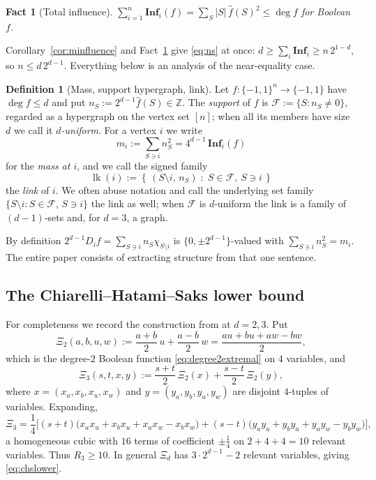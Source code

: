 \documentclass[11pt,reqno]{amsart}
\theoremstyle{plain}
\newtheorem{fact}[theorem]{Fact}
\theoremstyle{definition}
\newtheorem{definition}[theorem]{Definition}
\numberwithin{theorem}{section}
\newcommand{\cube}{\{-1,1\}}
\newcommand{\Inf}{\mathbf{Inf}}
\newcommand{\lk}{\operatorname{lk}}
\newcommand{\bbZ}{\mathbb{Z}}
\newcommand{\Fhat}[1]{\widehat{#1}}
\newcommand{\XiC}{\Xi}
\DeclareMathOperator{\Deg}{deg}
\begin{document}
\begin{fact}[Total influence]\label{fact:totalinf}
$\sum_{i=1}^n \Inf_i(f) = \sum_S |S|\,\Fhat{f}(S)^2 \le \Deg f$ for Boolean $f$.
\end{fact}

Corollary~\ref{cor:minfluence} and Fact~\ref{fact:totalinf} give \eqref{eq:ns} at once:
$d \ge \sum_i \Inf_i \ge n\,2^{1-d}$, so $n \le d\,2^{d-1}$. Everything below is an analysis of
the near-equality case.

\begin{definition}[Mass, support hypergraph, link]\label{def:link}
Let $f \colon \cube^n \to \cube$ have $\Deg f \le d$ and put $n_S := 2^{d-1}\Fhat{f}(S)
\in \bbZ$. The \emph{support} of $f$ is $\mathcal{F} := \{S : n_S \ne 0\}$, regarded as a
hypergraph on the vertex set $[n]$; when all its members have size $d$ we call it
\emph{$d$-uniform}. For a vertex $i$ we write
\[
  m_i := \sum_{S \ni i} n_S^2 = 4^{d-1}\,\Inf_i(f)
\]
for the \emph{mass at $i$}, and we call the signed family
\[
  \lk(i) := \left\{\, (S \setminus i,\, n_S) \;:\; S \in \mathcal{F},\ S \ni i \,\right\}
\]
the \emph{link} of $i$. We often abuse notation and call the underlying set family
$\{S \setminus i : S \in \mathcal{F},\, S \ni i\}$ the link as well; when $\mathcal{F}$ is
$d$-uniform the link is a family of $(d-1)$-sets and, for $d = 3$, a graph.
\end{definition}

By definition $2^{d-1}D_i f = \sum_{S \ni i} n_S \chi_{S \setminus i}$ is
$\{0, \pm 2^{d-1}\}$-valued with $\sum_{S \ni i} n_S^2 = m_i$. The entire paper consists of
extracting structure from that one sentence.

\subsection{The Chiarelli--Hatami--Saks lower bound}
For completeness we record the construction from \cite[\S3]{CHS20} at $d = 2, 3$. Put
\[
  \XiC_2(a,b,u,w) := \frac{a+b}{2}\,u + \frac{a-b}{2}\,w
  = \frac{au + bu + aw - bw}{2},
\]
which is the degree-$2$ Boolean function \eqref{eq:degree2extremal} on $4$ variables, and
\[
  \XiC_3(s,t,x,y) := \frac{s+t}{2}\,\XiC_2(x) + \frac{s-t}{2}\,\XiC_2(y),
\]
where $x = (x_a,x_b,x_u,x_w)$ and $y = (y_a,y_b,y_u,y_w)$ are disjoint $4$-tuples of variables.
Expanding,
\[
  \XiC_3 = \frac14\Big[ (s+t)\big(x_ax_u + x_bx_u + x_ax_w - x_bx_w\big)
        + (s-t)\big(y_ay_u + y_by_u + y_ay_w - y_by_w\big) \Big],
\]
a homogeneous cubic with $16$ terms of coefficient $\pm\frac14$ on
$2 + 4 + 4 = 10$ relevant variables. Thus $R_3 \ge 10$. In general
$\XiC_d$ has $3 \cdot 2^{d-1} - 2$ relevant variables, giving \eqref{eq:chslower}.
\end{document}
